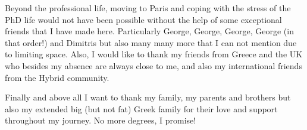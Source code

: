 Beyond the professional life, moving to Paris and coping with the stress of the PhD life would not have been possible without the help of some exceptional friends that I have made here. Particularly George, George, George, George (in that order!) and Dimitris but also many many more that I can not mention due to limiting space. Also, I would like to thank my friends from Greece and the UK who besides my absence are always close to me, and also my international friends from the Hybrid community.

Finally and above all I want to thank my family, my parents and brothers but also my extended big (but not fat) Greek family for their love and support throughout my journey. No more degrees, I promise!


